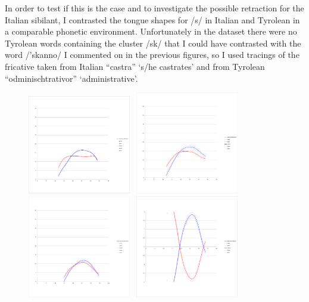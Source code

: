 \documentclass[output=paper]{LSP/langsci}
\begin{document}
In order to test if this is the case and to investigate the possible retraction for the Italian sibilant, I contrasted the tongue shapes for /s/ in Italian and Tyrolean in a comparable phonetic environment. Unfortunately in the dataset there were no Tyrolean words containing the cluster /sk/ that I could have contrasted with the word /'skanno/ I commented on in the previous figures, so I used tracings of the fricative taken from Italian “castra” `s/he castrates' and from Tyrolean “odminischtrativor” `administrative'.

\begin{figure}
\includegraphics[width=0.4\textwidth]{illustrations/sprea_fig5a}~
\includegraphics[width=0.4\textwidth]{illustrations/sprea_fig5b}\\
\includegraphics[width=0.4\textwidth]{illustrations/sprea_fig5c}~
\includegraphics[width=0.4\textwidth]{illustrations/sprea_fig5d}\\

\end{figure}
\end{document}
